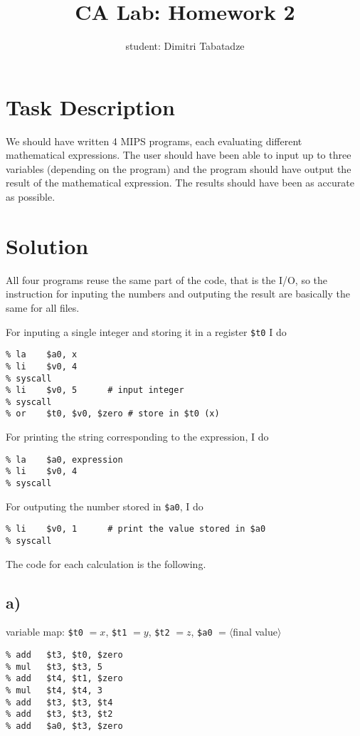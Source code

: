 \documentclass{article}
\title{CA Lab: Homework 2}
\author{student: Dimitri Tabatadze}
\begin{document}
    \maketitle

    \section*{Task Description}

    We should have written 4 MIPS programs, each evaluating different mathematical expressions. The user should have been able to input up to three variables (depending on the program) and the program should have output the result of the mathematical expression. The results should have been as accurate as possible.

    \section*{Solution}

    All four programs reuse the same part of the code, that is the I/O, so the instruction for inputing the numbers and outputing the result are basically the same for all files.

    For inputing a single integer and storing it in a register \verb|$t0| I do
    \begin{lstlisting}
% la	$a0, x
% li	$v0, 4
% syscall
% li	$v0, 5		# input integer
% syscall
% or	$t0, $v0, $zero	# store in $t0 (x)
    \end{lstlisting}

    For printing the string corresponding to the expression, I do
    \begin{lstlisting}
% la	$a0, expression
% li	$v0, 4
% syscall
    \end{lstlisting}

    For outputing the number stored in \verb|$a0|, I do
    \begin{lstlisting}
% li	$v0, 1		# print the value stored in $a0
% syscall
    \end{lstlisting}

    The code for each calculation is the following.

    \subsection*{a)}

    variable map: \verb|$t0| \(=x\), \verb|$t1| \(=y\), \verb|$t2| \(=z\), \verb|$a0| \(=\langle\)final value\(\rangle\)
    \begin{lstlisting}
% add	$t3, $t0, $zero
% mul	$t3, $t3, 5
% add	$t4, $t1, $zero
% mul	$t4, $t4, 3
% add	$t3, $t3, $t4
% add	$t3, $t3, $t2
% add	$a0, $t3, $zero
    \end{lstlisting}
\end{document}

